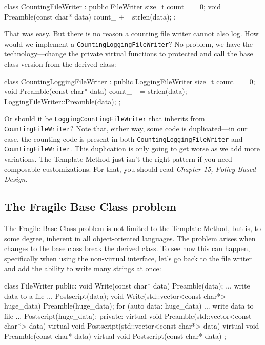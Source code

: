 \begin{code}
class CountingFileWriter : public FileWriter {
  size_t count_ = 0;
  void Preamble(const char* data) {
    count_ += strlen(data);
  }
};
\end{code}

That was easy. But there is no reason a counting file writer cannot also log. How would we implement a \texttt{CountingLoggingFileWriter}? No problem, we have the technology---change the private virtual functions to protected and call the base class version from the derived class:

\begin{code}
class CountingLoggingFileWriter : public LoggingFileWriter {
  size_t count_ = 0;
  void Preamble(const char* data) {
    count_ += strlen(data);
    LoggingFileWriter::Preamble(data);
  }
};
\end{code}

Or should it be \texttt{LoggingCountingFileWriter} that inherits from \texttt{CountingFileWriter}? Note that, either way, some code is duplicated---in our case, the counting code is present in both \texttt{CountingLoggingFileWriter} and \texttt{CountingFileWriter}. This duplication is only going to get worse as we add more variations. The Template Method just isn't the right pattern if you need composable customizations. For that, you should read \emph{Chapter 15, Policy-Based Design}.

\subsection{The Fragile Base Class problem}

The Fragile Base Class problem is not limited to the Template Method, but is, to some degree, inherent in all object-oriented languages. The problem arises when changes to the base class break the derived class. To see how this can happen, specifically when using the non-virtual interface, let's go back to the file writer and add the ability to write many strings at once:

\begin{code}
class FileWriter {
  public:
  void Write(const char* data) {
    Preamble(data);
    ... write data to a file ...
    Postscript(data);
  }
  void Write(std::vector<const char*> huge_data) {
    Preamble(huge_data);
    for (auto data: huge_data) {
      ... write data to file ...
    }
    Postscript(huge_data);
  }
  private:
  virtual void Preamble(std::vector<const char*> data) {}
  virtual void Postscript(std::vector<const char*> data) {}
  virtual void Preamble(const char* data) {}
  virtual void Postscript(const char* data) {}
};
\end{code}

